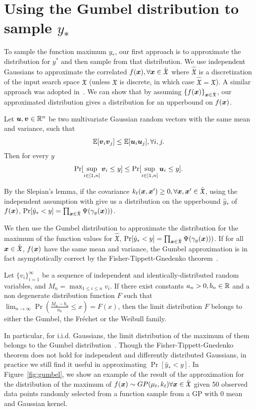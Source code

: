 \section{Using the Gumbel distribution to sample $y_*$}
To sample the function maximum $y_*$, our first approach is to approximate the distribution for $y^*$ and then sample from that distribution. We use independent Gaussians to approximate the correlated $f({\boldsymbol{x}}), \forall {\boldsymbol{x}}\in \hat{\mathfrak X}$ where $\hat{\mathfrak X}$ is a discretization of the input search space $\mathfrak X$ (unless $\mathfrak X$ is discrete, in which case $\hat{\mathfrak X}=\mathfrak X$). A similar approach was adopted in~\cite{wang2016est}. We can show that by assuming $\{f({\boldsymbol{x}})\}_{{\boldsymbol{x}}\in \hat{\mathfrak X}}$, our approximated distribution gives a distribution for an upperbound on $f({\boldsymbol{x}})$.

\begin{lem}
\label{lem:splepian}
Let $\boldsymbol{u}, \boldsymbol{v}\in \mathbb{R}^n$ be two multivariate Gaussian random vectors with the same mean and variance, such that
 $$\mathbb E [\boldsymbol{v}_i\boldsymbol{v}_j]\leq \mathbb E [\boldsymbol{u}_i\boldsymbol{u}_j], \forall i,j.$$ 
 Then for every $y$
 $$\Pr[\sup_{i\in[1,n]}\boldsymbol{v}_i \leq y] \leq \Pr[\sup_{i\in[1,n]}\boldsymbol{u}_i \leq y].$$
%
%
\end{lem}

By the Slepian's lemma, if the covariance $k_t({\boldsymbol{x}}, {\boldsymbol{x}}') \geq 0, \forall {\boldsymbol{x}},{\boldsymbol{x}}'\in  \hat{\mathfrak X}$, using the independent assumption with give us a distribution on the upperbound $\hat{y}_*$ of $f({\boldsymbol{x}})$, $\Pr[\hat{y}_* < y] = \prod_{{\boldsymbol{x}}\in\hat{\mathfrak X}} \Psi(\gamma_y({\boldsymbol{x}})))$.


We then use the  Gumbel distribution to approximate the distribution for the maximum of the function values for $\hat{\mathfrak X}$, $\Pr[\hat{y}_* < y] = \prod_{{\boldsymbol{x}}\in\hat{\mathfrak X}} \Psi(\gamma_y({\boldsymbol{x}})))$. If for all ${\boldsymbol{x}}\in\hat{\mathfrak X}$, $f({\boldsymbol{x}})$ have the same mean and variance, the Gumbel approximation is in fact asymptotically correct by the Fisher-Tippett-Gnedenko theorem~\cite{fisher1930genetical}. 
\begin{thm}
Let $\{v_i\}_{i=1}^\infty$ be a sequence of independent and identically-distributed random variables, and $M_n = \max_{1\leq i\leq n}v_i$. If there exist constants $a_n>0,b_n \in \mathbb{R}$ and a non degenerate distribution function $F$ such that $\lim_{n\rightarrow \infty} \Pr(\frac{M_n-b_n}{a_n}\leq x) = F(x)$, then the limit distribution $F$ belongs to either the Gumbel, the Fr{\'e}chet or the Weibull family.
\end{thm}
In particular, for i.i.d. Gaussians, the limit distribution of the maximum of them belongs to the Gumbel distribution~\cite{von1936distribution}.
 Though the Fisher-Tippett-Gnedenko theorem does not hold for independent and differently distributed Gaussians, in practice we still find it useful in approximating $\Pr[\hat{y}_* < y]$. In Figure~\ref{fig:gumbel}, we show an example of the result of the approximation for the distribution of the maximum of $f({\boldsymbol{x}})\sim GP(\mu_t,k_t) \forall {\boldsymbol{x}}\in\hat{\mathfrak X}$ given 50 observed data points randomly selected from a function sample from a GP with 0 mean and Gaussian kernel. 

